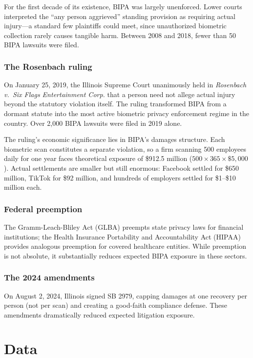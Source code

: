\documentclass[12pt]{article}
\begin{document}
For the first decade of its existence, BIPA was largely unenforced. Lower courts interpreted the ``any person aggrieved'' standing provision as requiring actual injury---a standard few plaintiffs could meet, since unauthorized biometric collection rarely causes tangible harm. Between 2008 and 2018, fewer than 50 BIPA lawsuits were filed.

\subsubsection*{The Rosenbach ruling} On January 25, 2019, the Illinois Supreme Court unanimously held in \textit{Rosenbach v.\ Six Flags Entertainment Corp.} that a person need not allege actual injury beyond the statutory violation itself. The ruling transformed BIPA from a dormant statute into the most active biometric privacy enforcement regime in the country. Over 2,000 BIPA lawsuits were filed in 2019 alone.

The ruling's economic significance lies in BIPA's damages structure. Each biometric scan constitutes a separate violation, so a firm scanning 500 employees daily for one year faces theoretical exposure of \$912.5 million ($500 \times 365 \times \$5{,}000$). Actual settlements are smaller but still enormous: Facebook settled for \$650 million, TikTok for \$92 million, and hundreds of employers settled for \$1--\$10 million each.

\subsubsection*{Federal preemption} The Gramm-Leach-Bliley Act (GLBA) preempts state privacy laws for financial institutions; the Health Insurance Portability and Accountability Act (HIPAA) provides analogous preemption for covered healthcare entities. While preemption is not absolute, it substantially reduces expected BIPA exposure in these sectors.

\subsubsection*{The 2024 amendments} On August 2, 2024, Illinois signed SB 2979, capping damages at one recovery per person (not per scan) and creating a good-faith compliance defense. These amendments dramatically reduced expected litigation exposure.

\section{Data}
\label{sec:data}
\end{document}
